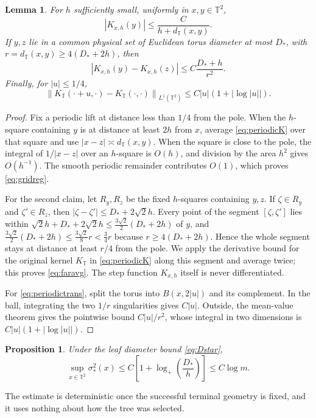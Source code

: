 \documentclass[11pt]{article}
\newtheorem{proposition}[proposition]{Proposition}
\newtheorem{lemma}[lemma]{Lemma}
\theoremstyle{definition}
\theoremstyle{remark}
\numberwithin{equation}{section}
\newcommand{\T}{\mathbb T}
\newcommand{\norm}[1]{\left\|#1\right\|}
\begin{document}
\begin{lemma}
\label{lem:periodic}
For $h$ sufficiently small, uniformly in $x,y\in\T^2$,
\begin{equation}\label{eq:gridreg}
 |K_{x,h}(y)|\le \frac{C}{h+d_{\T}(x,y)}.
\end{equation}
If $y,z$ lie in a common physical set of Euclidean torus
diameter at most $D_*$,
with $r=d_{\T}(x,y)\ge4(D_*+2h)$, then
\begin{equation}\label{eq:faravg}
 |K_{x,h}(y)-K_{x,h}(z)|
 \le C\frac{D_*+h}{r^2}.
\end{equation}
Finally, for $|u|\le1/4$,
\begin{equation}\label{eq:periodictrans}
 \norm{K_{\T}(\cdot+u,\cdot)-K_{\T}(\cdot,\cdot)}_{L^1(\T^2)}
 \le C|u|(1+|\log|u||).
\end{equation}
\end{lemma}
\begin{proof}
Fix a periodic lift at distance less than $1/4$ from the pole.
When the $h$-square containing $y$ is at distance at least
$2h$ from $x$, average \eqref{eq:periodicK} over that square
and use $|x-z|\asymp d_{\T}(x,y)$. When the square is close
to the pole, the integral of $1/|x-z|$ over an $h$-square is $O(h)$,
and division by the area $h^2$ gives $O(h^{-1})$.
The smooth periodic remainder contributes $O(1)$, which proves
\eqref{eq:gridreg}.

For the second claim, let $R_y,R_z$ be the fixed $h$-squares
containing $y,z$. If $\zeta\in R_y$ and $\zeta'\in R_z$,
then $|\zeta-\zeta'|\le D_*+2\sqrt2h$. Every point of the segment
$[\zeta,\zeta']$ lies within $\sqrt2h+D_*+2\sqrt2h\le\frac{3\sqrt2}{2}(D_*+2h)$
of $y$, and $\frac{3\sqrt2}{2}(D_*+2h)\le\frac{3\sqrt2}{8}r<\frac34r$
because $r\ge4(D_*+2h)$. Hence the whole segment stays at distance
at least $r/4$ from the pole. We apply the derivative bound for the
original kernel $K_{\T}$ in \eqref{eq:periodicK} along this segment
and average twice; this proves \eqref{eq:faravg}. The step function
$K_{x,h}$ itself is never differentiated.

For \eqref{eq:periodictrans}, split the torus into
$B(x,2|u|)$ and its complement. In the ball, integrating
the two $1/r$ singularities gives $C|u|$. Outside,
the mean-value theorem gives the pointwise bound $C|u|/r^2$, whose
integral in two dimensions is $C|u|(1+|\log|u||)$.
\end{proof}

\begin{proposition}
\label{prop:termvar}
Under the leaf diameter bound \eqref{eq:Dstar},
\begin{equation}\label{eq:logvar}
 \sup_{x\in\T^2}\sigma_*^2(x)
 \le C\left[1+\log_+\left(\frac{D_*}{h}\right)\right]
 \le C\log m.
\end{equation}
\end{proposition}
The estimate is deterministic once the successful terminal geometry is
fixed, and it uses nothing about how the tree was selected.
\end{document}
